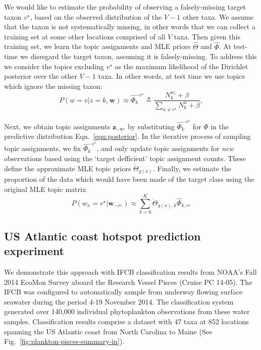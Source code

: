We would like to estimate the probability of observing a falsely-missing target taxon $v^\star$, based on the observed distribution of the $V-1$ other taxa.
We assume that the taxon is not systematically missing, in other words that we can collect a training set at some other locations comprised of all $V$ taxa.
Then given this training set, we learn the topic assignments and MLE priors $\hat{\Theta}$ and $\hat{\Phi}$. At test-time we disregard the target taxon, assuming it is falsely-missing. To address this we consider the topics excluding $v^\star$ as the maximum likelihood of the Dirichlet posterior over the other $V-1$ taxa. In other words, at test time we use topics which ignore the missing taxon:
\begin{equation}
P(w = v | z = k, \boldsymbol{w}) \approx \hat{\Phi}_k^{-v^\star} \triangleq \frac{N^{w_i}_k + \beta}{\sum_{u \neq v^\star} N^u_k + \beta},
\end{equation}

Next, we obtain topic assignments $\boldsymbol{z_{- v^\star}}$ by substituting $\hat{\Phi}_k^{- v^\star}$ for $\Phi$ in the predictive distribution Eqn.~\ref{eqn:posterior}. In the iterative process of sampling topic assignments, we fix $\hat{\Phi}_k^{-v^\star}$, and only update topic assignments for \emph{new} observations based using the `target defficient' topic assignment counts. These define the approximate MLE topic priors $\check{\Theta}_{g(x)}$. Finally, we estimate the proportion of the data which would have been made of the target class using the original MLE topic matrix
\begin{equation}
P(w_x = v^\star | \mathbf{w}_{-v^\star}) \approx \sum_{k=0}^K \check{\Theta}_{g(x),k} \hat{\Phi}_{k,v^\star}
\end{equation}

\subsection{US Atlantic coast hotspot prediction experiment}

We demonstrate this approach with IFCB classification results from NOAA's Fall 2014 EcoMon Survey aboard the Research Vessel Pisces (Cruise PC 14-05). The IFCB was configured to automatically sample from underway flowing surface seawater during the period 4-19 November 2014. The classification system generated over 140,000 individual phytoplankton observations from these water samples. Classification results comprise a dataset with 47 taxa at 852 locations spanning the US Atlantic coast from North Carolina to Maine (See Fig.~\ref{fig:plankton-pisces-summary-in}).

